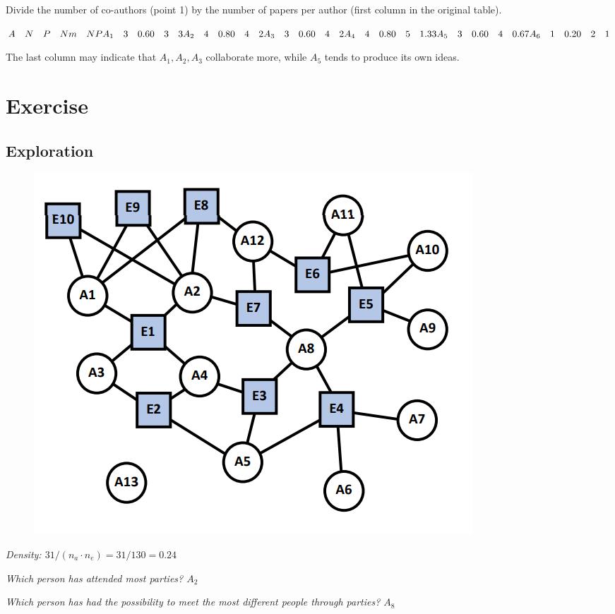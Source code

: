 \documentclass[
  notitlepage,
  onecolumn,
  openany]{book}
\begin{document}
\begin{itemize}
\begin{enumerate}
    Divide the number of co-authors (point 1) by the number of papers per author (first column in the original table).

    \(A \quad N\quad P \quad Nm\quad NP\\  A_1 \quad 3 \quad 0.60\quad 3\quad 3\\  A_2 \quad 4 \quad 0.80\quad 4\quad 2\\  A_3 \quad 3\quad 0.60\quad 4\quad 2\\  A_4 \quad 4\quad 0.80\quad 5\quad 1.33\\  A_5 \quad 3\quad 0.60\quad 4\quad 0.67\\  A_6 \quad 1 \quad 0.20\quad 2\quad 1\)

    The last column may indicate that \(A_1, A_2, A_3\) collaborate more, while \(A_5\) tends to produce its own ideas.
  \end{enumerate}
\end{itemize}

\hypertarget{exercise-1}{%
\section{Exercise}\label{exercise-1}}

\hypertarget{exploration}{%
\subsection{Exploration}\label{exploration}}

\begin{figure}[h!]

{\centering \includegraphics[width=0.4\linewidth]{images/10-Two mode networks/Untitled 6} 

}

\end{figure}

\emph{Density: \(31/(n_a\cdot n_e) = 31/130 = 0.24\)}

\emph{Which person has attended most parties? \(A_2\)}

\emph{Which person has had the possibility to meet the most different people through parties? \(A_8\)}
\end{document}
